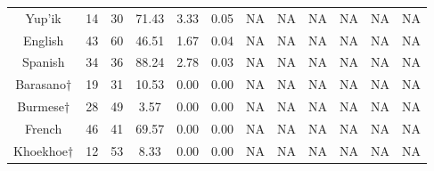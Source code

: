 \begin{tabular}{cccccccccccc}
Yup'ik & 14 & 30 & 71.43 & 3.33 & 0.05 & NA & NA & NA & NA & NA & NA \\
English & 43 & 60 & 46.51 & 1.67 & 0.04 & NA & NA & NA & NA & NA & NA \\
Spanish & 34 & 36 & 88.24 & 2.78 & 0.03 & NA & NA & NA & NA & NA & NA \\
Barasano$\dagger$ & 19 & 31 & 10.53 & 0.00 & 0.00 & NA & NA & NA & NA & NA & NA \\
Burmese$\dagger$ & 28 & 49 & 3.57 & 0.00 & 0.00 & NA & NA & NA & NA & NA & NA \\
French & 46 & 41 & 69.57 & 0.00 & 0.00 & NA & NA & NA & NA & NA & NA \\
Khoekhoe$\dagger$ & 12 & 53 & 8.33 & 0.00 & 0.00 & NA & NA & NA & NA & NA & NA
\end{tabular}